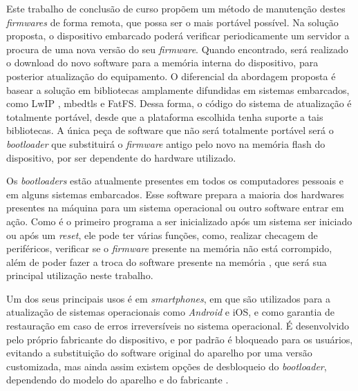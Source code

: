 
Este trabalho de conclusão de curso propõem um método de manutenção destes \textit{firmwares} de forma remota, que possa ser o mais portável possível.
Na solução proposta, o dispositivo embarcado poderá verificar periodicamente um servidor a procura de uma nova versão do seu \textit{firmware}. Quando encontrado, será realizado o download do novo software para a memória interna do dispositivo, para posterior atualização do equipamento. O diferencial da abordagem proposta é basear a solução em bibliotecas amplamente difundidas em sistemas embarcados, como LwIP \cite{LWIP}, mbedtls \cite{mbedtls} e FatFS\cite{FATFS}. Dessa forma, o código do sistema de atualização é totalmente portável, desde que a plataforma escolhida tenha suporte a tais bibliotecas. A única peça de software que não será totalmente portável será o \textit{bootloader} que substituirá o \textit{firmware} antigo pelo novo na memória flash do dispositivo, por ser dependente do hardware utilizado.

 

Os \textit{bootloaders} estão atualmente presentes em todos os computadores pessoais e em alguns sistemas embarcados. Esse software prepara a maioria dos hardwares presentes na máquina para um sistema operacional ou outro software entrar em ação.
Como é o primeiro programa a ser inicializado após um sistema ser iniciado ou após um \textit{reset}, ele pode ter várias funções, como, realizar checagem de periféricos, verificar se o \textit{firmware} presente na memória não está corrompido, além de poder fazer a troca do software presente na memória \cite{DavesDurlin2013}, que será sua principal utilização neste trabalho.

Um dos seus principais usos é em \textit{smartphones}, em que são utilizados para a atualização de sistemas operacionais como \textit{Android} e iOS, e como garantia de restauração em caso de erros irreversíveis no sistema operacional. É desenvolvido pelo próprio fabricante do dispositivo, e por padrão é bloqueado para os usuários, evitando a substituição do software original do aparelho por uma versão customizada, mas ainda assim existem opções de desbloqueio do \textit{bootloader}, dependendo do modelo do aparelho e do fabricante \cite{Salute2018}.%

